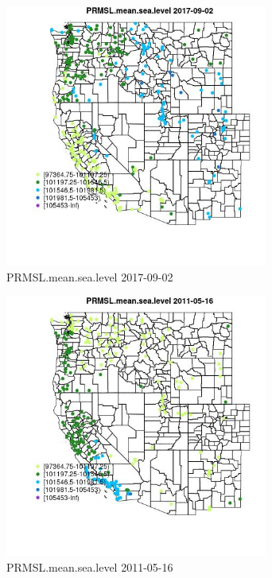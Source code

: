 \begin{figure} 
\centering  
\includegraphics[width=0.77\textwidth]{Code_Outputs/Report_ML_input_PM25_Step4_part_e_de_duplicated_aves_compiled_2019-05-21wNAs_MapObsPRMSLmeansealevel2017-09-02.jpg} 
\caption{\label{fig:Report_ML_input_PM25_Step4_part_e_de_duplicated_aves_compiled_2019-05-21wNAsMapObsPRMSLmeansealevel2017-09-02}PRMSL.mean.sea.level 2017-09-02} 
\end{figure} 
 

\begin{figure} 
\centering  
\includegraphics[width=0.77\textwidth]{Code_Outputs/Report_ML_input_PM25_Step4_part_e_de_duplicated_aves_compiled_2019-05-21wNAs_MapObsPRMSLmeansealevel2011-05-16.jpg} 
\caption{\label{fig:Report_ML_input_PM25_Step4_part_e_de_duplicated_aves_compiled_2019-05-21wNAsMapObsPRMSLmeansealevel2011-05-16}PRMSL.mean.sea.level 2011-05-16} 
\end{figure} 
 

